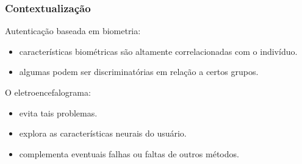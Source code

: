 \begin{frame}
	\frametitle{Contextualização}
	\par Autenticação baseada em biometria:
	
	\begin{itemize}
		\item características biométricas são altamente correlacionadas com o indivíduo.
		\item algumas podem ser discriminatórias em relação a certos grupos.
	\end{itemize}
	
	\par O eletroencefalograma:
	
	\begin{itemize}
		\item evita tais problemas.
		\item explora as características neurais do usuário.
		\item complementa eventuais falhas ou faltas de outros métodos.
	\end{itemize}

\end{frame}